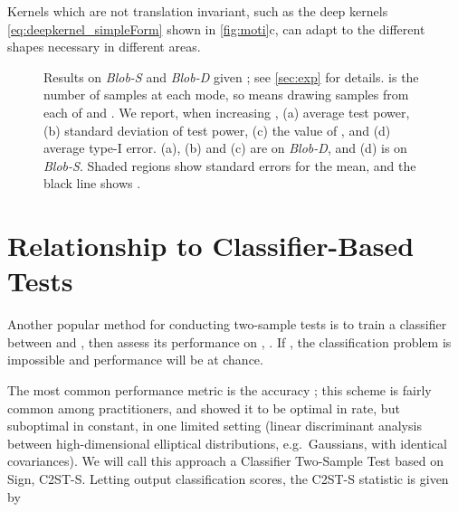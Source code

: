 \documentclass{article}
\begin{document}
Kernels which are not translation invariant,
such as the deep kernels \eqref{eq:deepkernel_simpleForm}
shown in \cref{fig:moti}c,
can adapt to the different shapes necessary in different areas.

\begin{figure*}[!t]
    \begin{center}
    \small
        \subfigure
        {}
        \vspace{-0.3cm}
        \caption{Results on \emph{Blob-S} and \emph{Blob-D} given ; see \cref{sec:exp} for details.  is the number of samples at each mode, so  means drawing  samples from each of  and . We report, when increasing , (a) average test power, (b) standard deviation of test power, (c) the value of , and (d) average type-I error. (a), (b) and (c) are on \emph{Blob-D}, and (d) is on \emph{Blob-S}. Shaded regions show standard errors for the mean, and the black line shows .}
        \label{fig:Blob_RES}
    \end{center}
    \vspace{-1em}
\end{figure*}

\section{Relationship to Classifier-Based Tests} \label{sec:c2st-relation}
Another popular method for conducting two-sample tests is to train a classifier between  and ,
then assess its performance on , .
If , the classification problem is impossible and performance will be at chance.

The most common performance metric is the accuracy \citep{Lopez:C2ST};
this scheme is fairly common among practitioners, and
\citet{Ramdas:clf} showed it to be optimal in rate, but suboptimal in constant, in one limited setting
(linear discriminant analysis between high-dimensional elliptical distributions, e.g.\ Gaussians, with identical covariances).
We will call this approach a Classifier Two-Sample Test based on Sign, C2ST-S.
Letting  output classification scores,
the C2ST-S statistic
is 
given by
\end{document}
